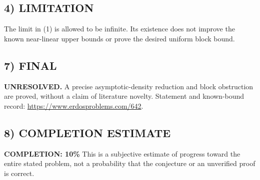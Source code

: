 \subsection*{4) LIMITATION}
The limit in (1) is allowed to be infinite. Its existence does not improve the known near-linear upper bounds or prove the desired uniform block bound.
\subsection*{7) FINAL}
\textbf{UNRESOLVED.} A precise asymptotic-density reduction and block obstruction are proved, without a claim of literature novelty.
\noindent Statement and known-bound record: \url{https://www.erdosproblems.com/642}.

\subsection*{8) COMPLETION ESTIMATE}
\textbf{COMPLETION: 10\%}
This is a subjective estimate of progress toward the entire stated problem, not a probability that the conjecture or an unverified proof is correct.
